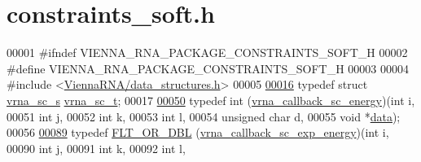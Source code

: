 \hypertarget{constraints__soft_8h_source}{}\section{constraints\+\_\+soft.\+h}
\label{constraints__soft_8h_source}

\begin{DoxyCode}
00001 \textcolor{preprocessor}{#ifndef VIENNA\_RNA\_PACKAGE\_CONSTRAINTS\_SOFT\_H}
00002 \textcolor{preprocessor}{#define VIENNA\_RNA\_PACKAGE\_CONSTRAINTS\_SOFT\_H}
00003 
00004 \textcolor{preprocessor}{#include <\hyperlink{data__structures_8h}{ViennaRNA/data\_structures.h}>}
00005 
\hyperlink{group__soft__constraints_ga75401ce219ef8dbcceb672db82d434c6}{00016} \textcolor{keyword}{typedef} \textcolor{keyword}{struct  }\hyperlink{group__soft__constraints_structvrna__sc__s}{vrna\_sc\_s} \hyperlink{group__soft__constraints_structvrna__sc__s}{vrna\_sc\_t};
00017 
\hyperlink{group__soft__constraints_ga88a266695d9e25cc12114dceb7b4565e}{00050} \textcolor{keyword}{typedef} int (\hyperlink{group__soft__constraints_ga88a266695d9e25cc12114dceb7b4565e}{vrna\_callback\_sc\_energy})(\textcolor{keywordtype}{int}           i,
00051                                       \textcolor{keywordtype}{int}           j,
00052                                       \textcolor{keywordtype}{int}           k,
00053                                       \textcolor{keywordtype}{int}           l,
00054                                       \textcolor{keywordtype}{unsigned} \textcolor{keywordtype}{char} d,
00055                                       \textcolor{keywordtype}{void}          *\hyperlink{group__soft__constraints_a7574680143df97b9029146c2150bf06d}{data});
00056 
\hyperlink{group__soft__constraints_ga4099978d410513edeeff8f3db13144c5}{00089} \textcolor{keyword}{typedef} \hyperlink{group__data__structures_ga31125aeace516926bf7f251f759b6126}{FLT\_OR\_DBL} (\hyperlink{group__soft__constraints_ga4099978d410513edeeff8f3db13144c5}{vrna\_callback\_sc\_exp\_energy})(\textcolor{keywordtype}{int}            i,
00090                                                  \textcolor{keywordtype}{int}            j,
00091                                                  \textcolor{keywordtype}{int}            k,
00092                                                  \textcolor{keywordtype}{int}            l,

\end{DoxyCode}
